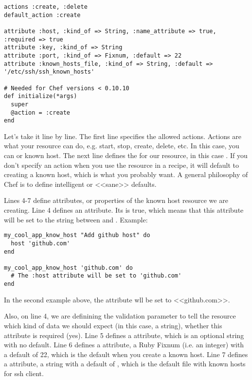 \begin{lstlisting}[label=lst:cookbook-lwrp1,title=my-server-cloud/site-cookbooks/my\_cool\_app/resources/know\_host.rb]
actions :create, :delete
default_action :create

attribute :host, :kind_of => String, :name_attribute => true, :required => true
attribute :key, :kind_of => String
attribute :port, :kind_of => Fixnum, :default => 22
attribute :known_hosts_file, :kind_of => String, :default => '/etc/ssh/ssh_known_hosts'

# Needed for Chef versions < 0.10.10
def initialize(*args)
  super
  @action = :create
end
\end{lstlisting}

Let's take it line by line. The first line specifies the allowed actions. Actions are what your resource can do, e.g. start, stop, create, delete, etc. In this case, you can  or  known host. The next line defines the  for our resource, in this case . If you don't specify an action when you use the resource in a recipe, it will default to creating a known host, which is what you probably want. A general philosophy of Chef is to define intelligent or <<sane>> defaults.

Lines 4-7 define attributes, or properties of the known host resource we are creating. Line 4 defines an  attribute. Its  is true, which means that this attribute will be set to the string between  and . Example:

\begin{lstlisting}[label=lst:cookbook-lwrp2]
my_cool_app_know_host "Add github host" do
  host 'github.com'
end

my_cool_app_know_host 'github.com' do
  # The :host attribute will be set to 'github.com'
end
\end{lstlisting}

In the second example above, the  attribute wll be set to <<github.com>>.

Also, on line 4, we are definining the  validation parameter to tell the resource which kind of data we should expect (in this case, a string), whether this attribute is required (yes). Line 5 defines a  attribute, which is an optional string with no default. Line 6 defines a  attribute, a Ruby Fixnum (i.e. an integer) with a default of 22, which is the default when you create a known host. Line 7 defines a  attribute, a string with a default of , which is the default file with known hosts for ssh client.

